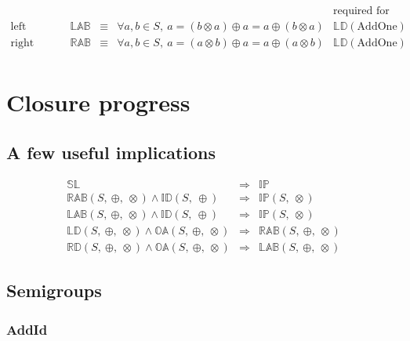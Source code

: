 \documentclass[10pt]{article}
\newcommand{\propname}[1]{{\mathbb{#1}}}
\begin{document}
\[ 
\begin{array}{c|ccl|l} 
   & 
   & 
   & 
   & \mbox{required for} 
   \\ \hline 
\mbox{left absorption}  
    & \propname{LAB}
    & \equiv 
    & \forall a, b\in S,\ a =  (b\otimes a) \oplus a = a \oplus (b \otimes a) 
    & \propname{LD}(\mathrm{AddOne})
   \\ 
\mbox{right absorption}  
    & \propname{RAB}
    & \equiv 
    & \forall a, b\in S,\ a =  (a\otimes b) \oplus a = a \oplus (a \otimes b) 
    & \propname{LD}(\mathrm{AddOne})
   \\ 
\end{array} 
\] 


\section{Closure progress}

\subsection{A few useful implications} 

\[ 
\begin{array}{rcl} 
\propname{SL}
   & \Rightarrow 
   & \propname{IP}\\ 
\propname{RAB}(S,\ \oplus,\ \otimes) \wedge \propname{ID}(S,\ \oplus)
    & \Rightarrow 
    & \propname{IP}(S,\ \otimes)\\ 
\propname{LAB}(S,\ \oplus,\ \otimes) \wedge \propname{ID}(S,\ \oplus)
    & \Rightarrow 
    & \propname{IP}(S,\ \otimes)\\ 
\propname{LD}(S,\ \oplus,\ \otimes) \wedge \propname{OA}(S,\ \oplus,\ \otimes)
    & \Rightarrow 
    & \propname{RAB}(S,\ \oplus,\ \otimes) \\ 
\propname{RD}(S,\ \oplus,\ \otimes) \wedge \propname{OA}(S,\ \oplus,\ \otimes) 
    & \Rightarrow 
    & \propname{LAB}(S,\ \oplus,\ \otimes)
\end{array} 
\] 

\subsection{Semigroups}


\subsubsection{AddId} 
\end{document}
